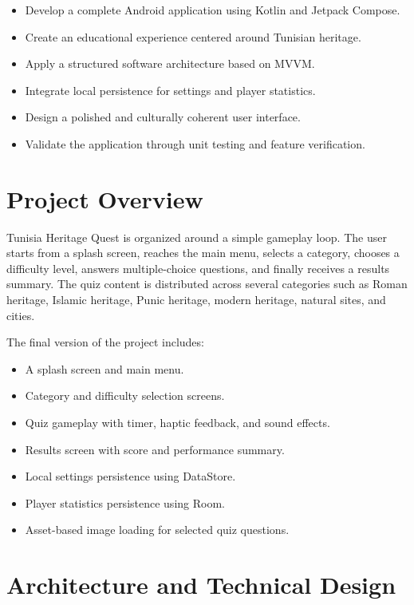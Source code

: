 \documentclass[12pt,a4paper]{article}
\begin{document}
\begin{itemize}[leftmargin=1.5em]
    \item Develop a complete Android application using Kotlin and Jetpack Compose.
    \item Create an educational experience centered around Tunisian heritage.
    \item Apply a structured software architecture based on MVVM.
    \item Integrate local persistence for settings and player statistics.
    \item Design a polished and culturally coherent user interface.
    \item Validate the application through unit testing and feature verification.
\end{itemize}

\section{Project Overview}
Tunisia Heritage Quest is organized around a simple gameplay loop. The user starts from a splash screen, reaches the main menu, selects a category, chooses a difficulty level, answers multiple-choice questions, and finally receives a results summary. The quiz content is distributed across several categories such as Roman heritage, Islamic heritage, Punic heritage, modern heritage, natural sites, and cities.

The final version of the project includes:

\begin{itemize}[leftmargin=1.5em]
    \item A splash screen and main menu.
    \item Category and difficulty selection screens.
    \item Quiz gameplay with timer, haptic feedback, and sound effects.
    \item Results screen with score and performance summary.
    \item Local settings persistence using DataStore.
    \item Player statistics persistence using Room.
    \item Asset-based image loading for selected quiz questions.
\end{itemize}

\section{Architecture and Technical Design}
\end{document}
